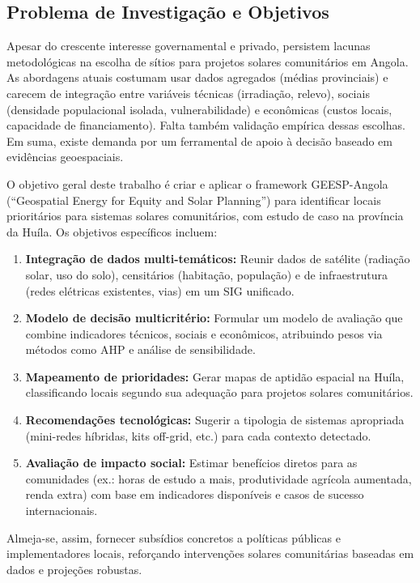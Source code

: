 \documentclass[12pt, a4paper]{article}
\begin{document}
\subsection{Problema de Investigação e Objetivos}

Apesar do crescente interesse governamental e privado, persistem lacunas metodológicas na escolha de sítios para projetos solares comunitários em Angola. As abordagens atuais costumam usar dados agregados (médias provinciais) e carecem de integração entre variáveis técnicas (irradiação, relevo), sociais (densidade populacional isolada, vulnerabilidade) e econômicas (custos locais, capacidade de financiamento). Falta também validação empírica dessas escolhas. Em suma, existe demanda por um ferramental de apoio à decisão baseado em evidências geoespaciais.

O objetivo geral deste trabalho é criar e aplicar o framework GEESP-Angola (``Geospatial Energy for Equity and Solar Planning'') para identificar locais prioritários para sistemas solares comunitários, com estudo de caso na província da Huíla. Os objetivos específicos incluem:

\begin{enumerate}
\item \textbf{Integração de dados multi-temáticos:} Reunir dados de satélite (radiação solar, uso do solo), censitários (habitação, população) e de infraestrutura (redes elétricas existentes, vias) em um SIG unificado.
\item \textbf{Modelo de decisão multicritério:} Formular um modelo de avaliação que combine indicadores técnicos, sociais e econômicos, atribuindo pesos via métodos como AHP e análise de sensibilidade.
\item \textbf{Mapeamento de prioridades:} Gerar mapas de aptidão espacial na Huíla, classificando locais segundo sua adequação para projetos solares comunitários.
\item \textbf{Recomendações tecnológicas:} Sugerir a tipologia de sistemas apropriada (mini-redes híbridas, kits off-grid, etc.) para cada contexto detectado.
\item \textbf{Avaliação de impacto social:} Estimar benefícios diretos para as comunidades (ex.: horas de estudo a mais, produtividade agrícola aumentada, renda extra) com base em indicadores disponíveis e casos de sucesso internacionais.
\end{enumerate}

Almeja-se, assim, fornecer subsídios concretos a políticas públicas e implementadores locais, reforçando intervenções solares comunitárias baseadas em dados e projeções robustas.
\end{document}
